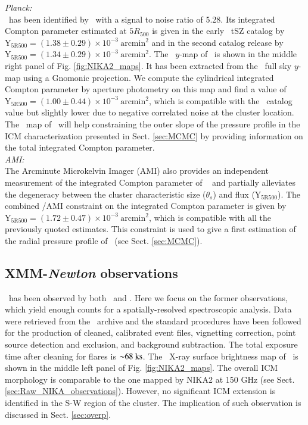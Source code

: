 \documentclass[traditabstract]{aa}
\begin{document}
\noindent\emph{Planck:}\\
\psz\ has been identified by \planck\ with a signal to noise ratio of 5.28. Its integrated Compton parameter estimated at $5R_{500}$ is given in the early \planck\ tSZ catalog by $\mathrm{Y_{5R500}} = (1.38 \pm 0.29) \times 10^{-3}~\mathrm{arcmin}^2$ and in the second catalog release by $\mathrm{Y_{5R500}} = (1.34 \pm 0.29) \times 10^{-3}~\mathrm{arcmin}^2$. The \planck\ $y$-map of \psz\ is shown in the middle right panel of Fig. \ref{fig:NIKA2_maps}. It has been extracted from the \planck\ full sky $y$-map \citep{pla16d} using a Gnomonic projection. We compute the cylindrical integrated Compton parameter by aperture photometry on this map and find a value of $\mathrm{Y_{5R500}} = (1.00 \pm 0.44) \times 10^{-3}~\mathrm{arcmin}^2$, which is compatible with the \planck\ catalog value but slightly lower due to negative correlated noise at the cluster location. The \planck\ map of \psz\ will help constraining the outer slope of the pressure profile in the ICM characterization presented in Sect. \ref{sec:MCMC} by providing information on the total integrated Compton parameter.\\

\noindent\emph{AMI:}\\
The Arcminute Microkelvin Imager (AMI) also provides an independent measurement of the integrated Compton parameter of \psz\ \citep{per15} and partially alleviates the degeneracy between the cluster characteristic size ($\theta_s$) and flux ($\mathrm{Y_{5R500}}$). The combined {\planck}/AMI constraint on the integrated Compton parameter is given by $\mathrm{Y_{5R500}} = (1.72\pm 0.47) \times 10^{-3}~\mathrm{arcmin}^2$, which is compatible with all the previously quoted estimates. This constraint is used to give a first estimation of the radial pressure profile of \psz\ (see Sect. \ref{sec:MCMC}).


\subsection{XMM-{\it Newton} observations}\label{sec:XMM}
\psz\ has been observed by both \xmm\ and \chandra. Here we focus on the former observations, which yield enough counts for a spatially-resolved spectroscopic analysis. Data were retrieved from the \xmm\ archive and the standard procedures \citep[see \emph{e.g.} ][]{bar17} have been followed for the production of cleaned, calibrated event files, vignetting correction, point source detection and exclusion, and background subtraction. The total exposure time after cleaning for flares is ${\sim}68~\rm{ks}$. The \xmm\ X-ray surface brightness map of \psz\ is shown in the middle left panel of Fig. \ref{fig:NIKA2_maps}. The overall ICM morphology is comparable to the one mapped by NIKA2 at 150 GHz (see Sect. \ref{sec:Raw_NIKA_observations}). However, no significant ICM extension is identified in the S-W region of the cluster. The implication of such observation is discussed in Sect. \ref{sec:overp}.
\end{document}
